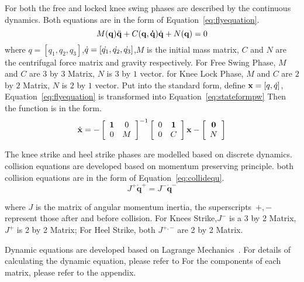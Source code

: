 \begin{itemize}
For both the free and locked knee swing phases are described by the continuous dynamics.
Both equations are in the form of Equation~\ref{eq:flyequation}.
\begin{equation}
\label{eq:flyequation}
M(\mathbf{q}) \ddot{\mathbf{q}} + C(\mathbf{q,\dot{q}})\dot{\mathbf{q}} + N(\mathbf{q}) = 0
\end{equation}
where $q=[q_1,q_2,q_3]$,$\dot{q}=[\dot{q_1},\dot{q_2},\dot{q_3}]$,$M$ is the initial mass matrix, $C$ and $N$ are the centrifugal force matrix and gravity respectively. 
For Free Swing Phase,  $M$ and $C$ are $3$ by $3$ Matrix, $N$ is $3$ by $1$ vector.
for Knee Lock Phase, $M$ and $C$ are $2$ by $2$ Matrix, $N$ is $2$ by $1$ vector.
Put into the standard form, define $\mathbf{x}=[q,\dot{q}]$, Equation~\ref{eq:flyequation} is transformed into Equation~\ref{eq:stateformpw}
Then the function is in the form.
\begin{equation}
\label{eq:stateformpw}
\dot{\mathbf{x}}=
-\left[ 
\begin{array}{cc}
\mathbf{1} &0\\
0 &M 
\end{array}
\right]^{-1}
\left[ 
\begin{array}{cc}
0 &\mathbf{1}\\
0 &C 
\end{array}
\right]\mathbf{x}
-\left[ 
\begin{array}{c}
\mathbf{0}\\
 N 
\end{array}
\right]
\end{equation}

The knee strike and heel strike phases are modelled based on discrete dynamics.
collision equations are developed based on momentum preserving principle.
both collision equations are in the form of Equation~\ref{eq:collidequ}.
\begin{equation}
\label{eq:collidequ}
J^{+}\dot{\mathbf{q}}^{+} = J^{-}\dot{\mathbf{q}}^{-}
\end{equation}

where $J$ is the matrix of angular momentum inertia, the superscripts~$+,-$ represent those after and before collision.
For Knees Strike,$J^-$ is a 3 by 2 Matrix, $J^+$ is 2 by 2 Matrix;
For Heel Strike, both $J^{+,-}$ are 2 by 2 Matrix.
\end{itemize}
Dynamic equations are developed based on Lagrange Mechanics~\citep{Goldstein2002}.
For details of calculating the dynamic equation, please refer to \citep{Chen2007}
For the components of each matrix, please refer to the appendix.









